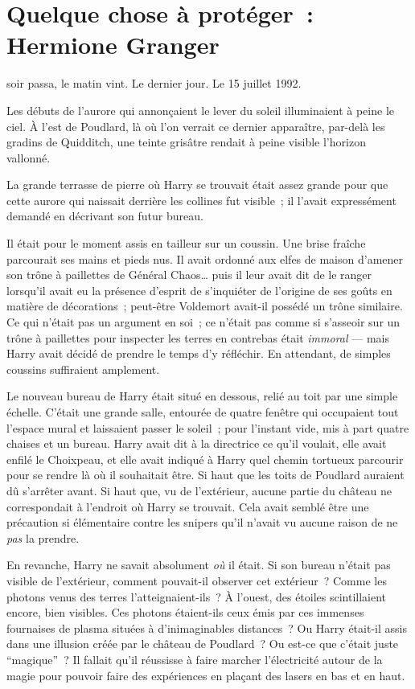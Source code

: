 \chapter{Quelque chose à protéger~: Hermione Granger}

 soir passa, le matin vint. Le dernier jour. Le 15 juillet 1992.

\hplettrineextrapara
Les débuts de l'aurore qui annonçaient le lever du soleil illuminaient à peine le ciel. À l'est de Poudlard, là où l'on verrait ce dernier apparaître, par-delà les gradins de Quidditch, une teinte grisâtre rendait à peine visible l'horizon vallonné.

La grande terrasse de pierre où Harry se trouvait était assez grande pour que cette aurore qui naissait derrière les collines fut visible~; il l'avait expressément demandé en décrivant son futur bureau.

Il était pour le moment assis en tailleur sur un coussin. Une brise fraîche parcourait ses mains et pieds nus. Il avait ordonné aux elfes de maison d'amener son trône à paillettes de Général Chaos… puis il leur avait dit de le ranger lorsqu'il avait eu la présence d'esprit de s'inquiéter de l'origine de ses goûts en matière de décorations~; peut-être Voldemort avait-il possédé un trône similaire. Ce qui n'était pas un argument en soi~; ce n'était pas comme si s'asseoir sur un trône à paillettes pour inspecter les terres en contrebas était \emph{immoral} — mais Harry avait décidé de prendre le temps d'y réfléchir. En attendant, de simples coussins suffiraient amplement.

Le nouveau bureau de Harry était situé en dessous, relié au toit par une simple échelle. C'était une grande salle, entourée de quatre fenêtre qui occupaient tout l'espace mural et laissaient passer le soleil~; pour l'instant vide, mis à part quatre chaises et un bureau. Harry avait dit à la directrice ce qu'il voulait, elle avait enfilé le Choixpeau, et elle avait indiqué à Harry quel chemin tortueux parcourir pour se rendre là où il souhaitait être. Si haut que les toits de Poudlard auraient dû s'arrêter avant. Si haut que, vu de l'extérieur, aucune partie du château ne correspondait à l'endroit où Harry se trouvait. Cela avait semblé être une précaution si élémentaire contre les snipers qu'il n'avait vu aucune raison de ne \emph{pas} la prendre.

En revanche, Harry ne savait absolument \emph{où} il était. Si son bureau n'était pas visible de l'extérieur, comment pouvait-il observer cet extérieur~? Comme les photons venus des terres l'atteignaient-ils~? À l'ouest, des étoiles scintillaient encore, bien visibles. Ces photons étaient-ils ceux émis par ces immenses fournaises de plasma situées à d'inimaginables distances~? Ou Harry était-il assis dans une illusion créée par le château de Poudlard~? Ou est-ce que c'était juste “magique”~? Il fallait qu'il réussisse à faire marcher l'électricité autour de la magie pour pouvoir faire des expériences en plaçant des lasers en bas et en haut.

